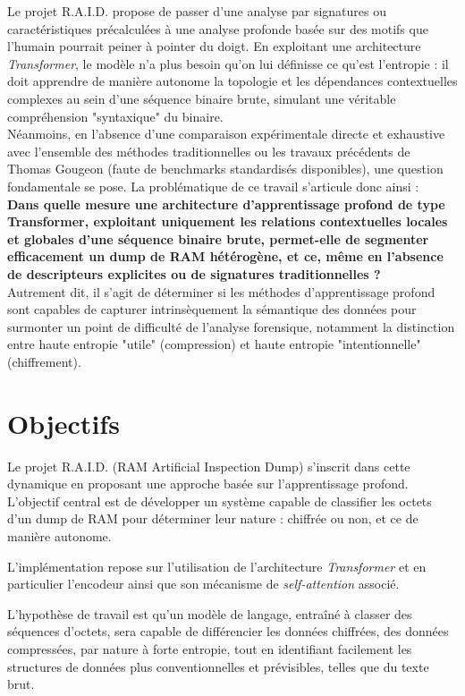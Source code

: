 \documentclass[12pt]{report}
\begin{document}
    Le projet R.A.I.D. propose de passer d'une analyse par signatures ou caractéristiques précalculées à une analyse profonde basée sur des motifs que l'humain pourrait peiner à pointer du doigt. En exploitant une architecture \textit{Transformer}, le modèle n'a plus besoin qu'on lui définisse ce qu'est l'entropie : il doit apprendre de manière autonome la topologie et les dépendances contextuelles complexes au sein d'une séquence binaire brute, simulant une véritable compréhension "syntaxique" du binaire.\\

    Néanmoins, en l'absence d'une comparaison expérimentale directe et exhaustive avec l'ensemble des méthodes traditionnelles ou les travaux précédents de Thomas Gougeon (faute de benchmarks standardisés disponibles), une question fondamentale se pose. La problématique de ce travail s'articule donc ainsi :\\

    \textbf{Dans quelle mesure une architecture d'apprentissage profond de type Transformer, exploitant uniquement les relations contextuelles locales et globales d'une séquence binaire brute, permet-elle de segmenter efficacement un dump de RAM hétérogène, et ce, même en l'absence de descripteurs explicites ou de signatures traditionnelles ?}\\

    Autrement dit, il s'agit de déterminer si les méthodes d'apprentissage profond sont capables de capturer intrinsèquement la sémantique des données pour surmonter un point de difficulté de l'analyse forensique, notamment la distinction entre haute entropie "utile" (compression) et haute entropie "intentionnelle" (chiffrement).


    \section{Objectifs}\label{sec:objectifs}
    Le projet R.A.I.D. (RAM Artificial Inspection Dump) s'inscrit dans cette dynamique en proposant une approche basée sur l'apprentissage profond. L'objectif central est de développer un système capable de classifier les octets d'un dump de RAM pour déterminer leur nature : chiffrée ou non, et ce de manière autonome.

    L'implémentation repose sur l'utilisation de l'architecture \textit{Transformer} et en particulier l'encodeur ainsi que son mécanisme de \textit{self-attention} associé.

    L'hypothèse de travail est qu'un modèle de langage, entraîné à classer des séquences d'octets, sera capable de différencier les données chiffrées, des données compressées, par nature à forte entropie, tout en identifiant facilement les structures de données plus conventionnelles et prévisibles, telles que du texte brut.
\end{document}
